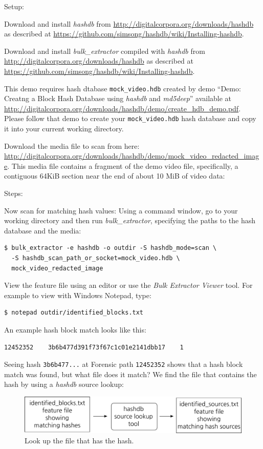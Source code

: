 \documentclass[12pt,twoside]{article}
\newcommand{\hdb}{\emph{hashdb}\xspace}
\newcommand{\bulk}{\emph{bulk\_extractor}\xspace}
\newcommand{\mdd}{\emph{md5deep}\xspace}
\newcommand{\bev}{\emph{Bulk Extractor Viewer}\xspace}
\begin{document}
Setup:
\begin{compactenum}
\item Download and install \hdb from
\url{http://digitalcorpora.org/downloads/hashdb}
as described at
\url{https://github.com/simsong/hashdb/wiki/Installing-hashdb}.
\item Download and install \bulk compiled with \hdb from
\url{http://digitalcorpora.org/downloads/hashdb}
as described at
\url{https://github.com/simsong/hashdb/wiki/Installing-hashdb}.
\item This demo requires hash dtabase \texttt{mock\_video.hdb}
created by demo ``Demo: Creatng a Block Hash Database using \hdb and \mdd''
available at
\url{http://digitalcorpora.org/downloads/hashdb/demo/create\_hdb\_demo.pdf}.
Please follow that demo to create your \texttt{mock\_video.hdb} hash database
and copy it into your current working directory.
\item Download the media file to scan from here:
\url{http://digitalcorpora.org/downloads/hashdb/demo/mock\_video\_redacted\_image}.
This media file contains a fragment of the demo video file,
specifically, a contiguous 64KiB section
near the end of about 10 MiB of video data:
\end{compactenum}
Steps:
\begin{compactenum}
\item Now scan for matching hash values:
Using a command window, go to your working directory and then run \bulk,
specifying the paths to the hash database and the media:
\begin{verbatim}
$ bulk_extractor -e hashdb -o outdir -S hashdb_mode=scan \
  -S hashdb_scan_path_or_socket=mock_video.hdb \
  mock_video_redacted_image
\end{verbatim}
\item View the feature file using an editor or use the \bev tool.
For example to view with Windows Notepad, type:
\begin{verbatim}
$ notepad outdir/identified_blocks.txt
\end{verbatim}
An example hash block match looks like this:
\begin{verbatim}
12452352    3b6b477d391f73f67c1c01e2141dbb17    1
\end{verbatim}
\end{compactenum}

Seeing hash \texttt{3b6b477...} at Forensic path \texttt{12452352}
shows that a hash block match was found, but what file does it match?
We find the file that contains the hash by using a \hdb source lookup:
\begin{figure}[H]
  \center
  \includegraphics[scale=0.6]{drawings/source_lookup}
  \caption*{Look up the file that has the hash.}
  \label{fig:source_lookup}
\end{figure}
\end{document}
